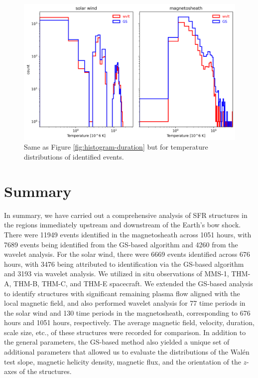 \begin{figure}
    \centering
    \includegraphics[width=\textwidth]{Figures/Histograms/histogram_temperature.png}
    \caption[Histograms of temperature for identified events]{Same as Figure \ref{fig:histogram-duration} but for temperature distributions of identified events.}
    \label{fig:histogram-temperature}
\end{figure}

\section{Summary}
In summary, we have carried out a comprehensive analysis of SFR structures in the regions immediately upstream and downstream of the Earth's bow shock. There were 11949 events identified in the magnetosheath across 1051 hours, with 7689 events being identified from the GS-based algorithm and 4260 from the wavelet analysis. For the solar wind, there were 6669 events identified across 676 hours, with 3476 being attributed to identification via the GS-based algorithm and 3193 via wavelet analysis. We utilized in situ observations of MMS-1, THM-A, THM-B, THM-C, and THM-E spacecraft. We extended the GS-based analysis to identify structures with significant remaining plasma flow aligned with the local magnetic field, and also performed wavelet analysis for 77 time periods in the solar wind and 130 time periods in the magnetosheath, corresponding to 676 hours and 1051 hours, respectively. The average magnetic field, velocity, duration, scale size, etc., of these structures were recorded for comparison. In addition to the general parameters, the GS-based method also yielded a unique set of additional parameters that allowed us to evaluate the distributions of the Wal\'en test slope, magnetic helicity density, magnetic flux, and the orientation of the $z$-axes of the structures.

